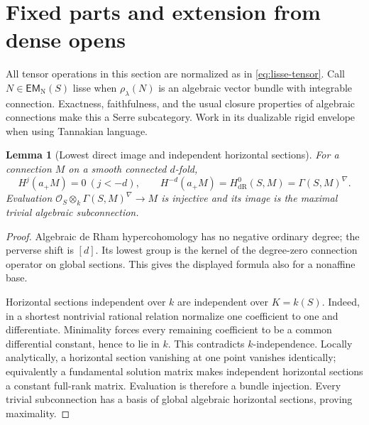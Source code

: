 \documentclass[11pt]{article}
\numberwithin{equation}{section}
\newtheorem{lemma}[lemma]{Lemma}
\theoremstyle{definition}
\theoremstyle{remark}
\newcommand{\Ocal}{\mathcal O}
\newcommand{\EM}{\mathsf{EM}_{\mathrm N}}
\newcommand{\dR}{\mathrm{dR}}
\begin{document}
\section{Fixed parts and extension from dense opens}\label{sec:fixed}

All tensor operations in this section are normalized as in
\eqref{eq:lisse-tensor}. Call $N\in\EM(S)$ lisse when $\rho_\lambda(N)$
is an algebraic vector bundle with integrable connection. Exactness,
faithfulness, and the usual closure properties of algebraic connections
make this a Serre subcategory. Work in its dualizable rigid envelope when
using Tannakian language.

\begin{lemma}[Lowest direct image and independent horizontal sections]\label{lem:lowest}
For a connection $M$ on a smooth connected $d$-fold,
\[
 H^j(a_+M)=0\ (j<-d),\qquad
 H^{-d}(a_+M)=H^0_{\dR}(S,M)=\Gamma(S,M)^\nabla.
\]
Evaluation $\Ocal_S\otimes_k\Gamma(S,M)^\nabla\to M$ is injective and
its image is the maximal trivial algebraic subconnection.
\end{lemma}
\begin{proof}
Algebraic de Rham hypercohomology has no negative ordinary degree; the
perverse shift is $[d]$. Its lowest group is the kernel of the degree-zero
connection operator on global sections. This gives the displayed formula
also for a nonaffine base.

Horizontal sections independent over $k$ are independent over $K=k(S)$.
Indeed, in a shortest nontrivial rational relation normalize one coefficient
to one and differentiate. Minimality forces every remaining coefficient to
be a common differential constant, hence to lie in $k$. This contradicts
$k$-independence. Locally analytically, a horizontal section vanishing at
one point vanishes identically; equivalently a fundamental solution
matrix makes independent horizontal sections a constant full-rank matrix.
Evaluation is therefore a bundle injection. Every trivial subconnection
has a basis of global algebraic horizontal sections, proving maximality.
\end{proof}
\end{document}
